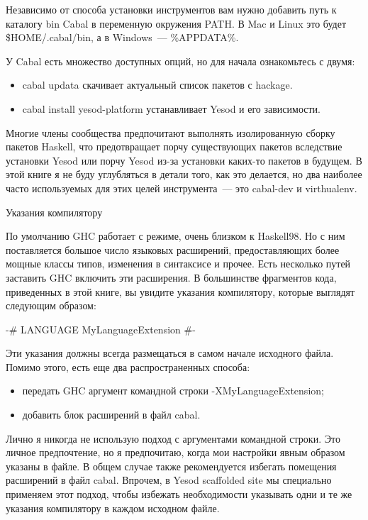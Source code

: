 Независимо от способа установки инструментов вам нужно добавить путь к каталогу bin Cabal в переменную окружения PATH. В Mac и Linux это будет \$HOME/.cabal/bin, а в Windows~--- \%APPDATA\%\cabal\bin.

У Cabal есть множество доступных опций, но для начала ознакомьтесь с двумя:

\begin{itemize}
  \item cabal updata скачивает актуальный список пакетов с hackage.
  \item cabal install yesod-platform устанавливает Yesod и его зависимости.
\end{itemize}

Многие члены сообщества предпочитают выполнять изолированную сборку пакетов Haskell, что предотвращает порчу существующих пакетов вследствие установки Yesod или порчу Yesod из-за установки каких-то пакетов в будущем. В этой книге я не буду углубляться в детали того, как это делается, но два наиболее часто используемых для этих целей инструмента~--- это cabal-dev и virthualenv.

Указания компилятору

По умолчанию GHC работает с режиме, очень близком к Haskell98. Но с ним поставляется большое число языковых расширений, предоставляющих более мощные классы типов, изменения в синтаксисе и прочее. Есть несколько путей заставить GHC включить эти расширения. В большинстве фрагментов кода, приведенных в этой книге, вы увидите указания компилятору, которые выглядят следующим образом:

{-# LANGUAGE MyLanguageExtension #-}

Эти указания должны всегда размещаться в самом начале исходного файла. Помимо этого, есть еще два распространенных способа:
\begin{itemize}
\item передать GHC аргумент командной строки -XMyLanguageExtension;
\item добавить блок расширений в файл cabal.
\end{itemize}

Лично я никогда не использую подход с аргументами командной строки. Это личное предпочтение, но я предпочитаю, когда мои настройки явным образом указаны в файле. В общем случае также рекомендуется избегать помещения расширений в файл cabal. Впрочем, в Yesod scaffolded site мы специально применяем этот подход, чтобы избежать необходимости указывать одни и те же указания компилятору в каждом исходном файле.

